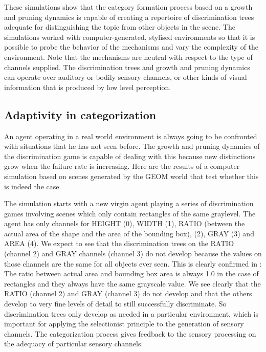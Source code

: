 These simulations show that the
category formation process based on a growth and pruning
dynamics is capable of creating a repertoire of
discrimination trees adequate for distinguishing 
the topic from other objects in the scene. The simulations 
worked with computer-generated, stylised environments
so that it is possible to probe the behavior of 
the mechanisms and vary the complexity of the environment. 
Note that the mechanisms are neutral with respect 
to the type of channels supplied. The discrimination 
trees and growth and pruning dynamics can operate over
auditory or bodily sensory channels, or other kinds
of visual information that is produced by low level 
perception. 

\subsection{Adaptivity in categorization}

An agent operating in a real world environment is always
going to be confronted with situations that he has 
not seen before. The growth and pruning dynamics of the 
discrimination game is capable of dealing with this because 
new distinctions grow when the failure rate 
is increasing. Here are the results of a computer 
simulation based on scenes generated by the 
GEOM world that test whether this is indeed the case. 

The simulation starts with a new virgin agent 
playing a series of discrimination games involving scenes
which only contain rectangles of the same graylevel. 
The agent has only channels for HEIGHT (0), WIDTH (1), 
RATIO (between the actual area of the shape 
and the area of the bounding box),
(2), GRAY (3) and AREA (4). We expect
to see that the discrimination trees on the RATIO (channel 
2) and GRAY channels (channel 3) do not develop because 
the values on those channels 
are the same for all objects ever seen. This is 
clearly confirmed in : The ratio
between actual area and bounding box area is always 1.0
in the case of rectangles and they always have the same
grayscale value. 
We see clearly that the RATIO (channel 2) and GRAY (channel 3) 
do not develop and that the others develop to very 
fine levels of detail to still successfully discriminate. 
So discrimination trees only 
develop as needed in a particular environment, which is 
important for applying the selectionist
principle to the generation of sensory channels. 
The categorization process gives feedback to 
the sensory processing on the adequacy of particular sensory 
channels. 


